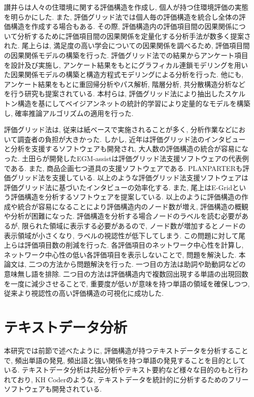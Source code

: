 \documentclass[syuuron]{kuee}
\begin{document}
		讃井らは人々の住環境に関する評価構造を作成し, 個人が持つ住環境評価の実態を明らかにした. 
		また, 評価グリッド法では個人毎の評価構造を統合し全体の評価構造を作成する場合もある. 
		その際, 評価構造内の評価項目間の因果関係について分析するために評価項目間の因果関係を定量化する分析手法が数多く提案された. 
		尾上らは, 満足度の高い学会についての因果関係を調べるため, 評価項目間の因果関係モデルの構築を行った\cite{egm8}. 
		評価グリッド法での結果からアンケート項目を設計及び実施し, アンケート結果をもとにグラフィカル連鎖モデリングを用いた因果関係モデルの構築と構造方程式モデリングによる分析を行った. 
		他にも, アンケート結果をもとに重回帰分析やパス解析, 階層分析, 共分散構造分析などを行う研究も提案されている. 
		本村らは, 評価グリッド法により抽出したスケルトン構造を基にしてベイジアンネットの統計的学習により定量的なモデルを構築し, 確率推論アルゴリズムの適用を行った\cite{egm9}. 
		
		評価グリッド法は, 従来は紙ベースで実施されることが多く, 分析作業などにおいて調査者の負担が大きかった. 
		しかし, 近年は評価グリッド法のインタビューと分析を支援するソフトウェアも開発され, 大人数の評価構造の統合が容易になった. 
		土田らが開発したEGM-assistは評価グリッド法支援ソフトウェアの代表例である. また, 商品企画七つ道具の支援ソフトウェアである. PLANPARTERも評価グリッド法を支援している. 
		以上のような評価グリッド法支援ソフトウェアは評価グリッド法に基づいたインタビューの効率化する. 
		また, 尾上はE-Gridという評価構造を分析するソフトウェアを提案している. 
		以上のように評価構造の作成や統合が容易になることにより評価構造内のノード数が増え, 評価構造の概観や分析が困難になった. 
		評価構造を分析する場合ノードのラベルを読む必要があるが, 限られた領域に表示する必要があるので, 
		ノード数が増加するとノードの表示領域が小さくなり, ラベルの視認性が低下してしまう. 
		この問題に対して尾上らは評価項目数の削減を行った\cite{net1}. 
		各評価項目のネットワーク中心性を計算し, ネットワーク中心性の低い各評価項目を表示しないことで, 問題を解決した. 
		本論文は, 二つの方法から問題解決を行った. 
		一つ目の方法は助詞や助動詞などの意味無し語を排除. 二つ目の方法は評価構造内で複数回出現する単語の出現回数を一度に減少させることで, 
		重要度が低いが意味を持つ単語の領域を確保しつつ, 従来より視認性の高い評価構造の可視化に成功した. 
		
	\section{テキストデータ分析}
		本研究では前節で述べたように, 評価構造が持つテキストデータを分析することで, 
		頻出単語の発見, 頻出語と強い関係を持つ単語の発見することを目的としている.  
		テキストデータ分析は共起分析やテキスト要約など様々な目的のもと行われており, 
		KH Coderのような, テキストデータを統計的に分析するためのフリーソフトウェアも開発されている. 
		
\end{document}
